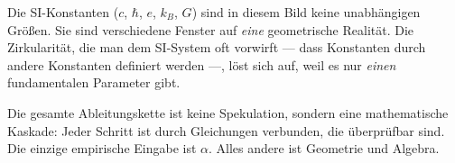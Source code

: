 Die SI-Konstanten ($c$, $\hbar$, $e$, $k_B$, $G$) sind in diesem Bild keine unabhängigen Größen. Sie sind verschiedene Fenster auf \emph{eine} geometrische Realität. Die Zirkularität, die man dem SI-System oft vorwirft --- dass Konstanten durch andere Konstanten definiert werden ---, löst sich auf, weil es nur \emph{einen} fundamentalen Parameter gibt.

\begin{kerngedanke}
Die gesamte Ableitungskette ist keine Spekulation, sondern eine mathematische Kaskade: Jeder Schritt ist durch Gleichungen verbunden, die überprüfbar sind. Die einzige empirische Eingabe ist $\alpha$. Alles andere ist Geometrie und Algebra.
\end{kerngedanke}
